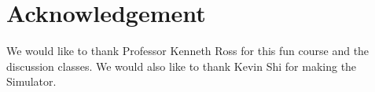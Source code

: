 \section{Acknowledgement}
We would like to thank Professor Kenneth Ross for this fun course and the discussion classes. We would also like to thank Kevin Shi for making the Simulator.
